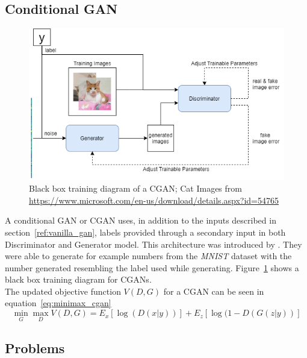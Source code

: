 \documentclass{article}
\begin{document}
\subsection{Conditional GAN}
\begin{figure}[!ht]
    \centering
    \includegraphics[scale=.6]{images/CGANBlackbox.png}
    \caption{Black box training diagram of a CGAN; Cat Images from \url{https://www.microsoft.com/en-us/download/details.aspx?id=54765}}
    \label{fig:CGAN_training}
\end{figure}
A conditional GAN or CGAN uses, in addition to the inputs described in section~\ref{ref:vanilla_gan}, labels provided through a secondary input in both Discriminator and Generator model. This architecture was introduced by \citeauthor{mirza_conditional_2014} \autocite*{mirza_conditional_2014}. They were able to generate for example numbers from the \textit{MNIST} dataset with the number generated resembling the label used while generating. Figure~\ref{fig:CGAN_training} shows a black box training diagram for CGANs.
\\
The updated objective function $V(D,G)$ for a CGAN can be seen in equation~\ref{eq:minimax_cgan}
\begin{equation}
    \label{eq:minimax_cgan}
    \min\limits_G \max\limits_D V(D,G) =  E_{x}[\log(D(x|y))] + E_{z}[\log(1-D(G(z|y))]
\end{equation}

\subsection{Problems}
\end{document}
